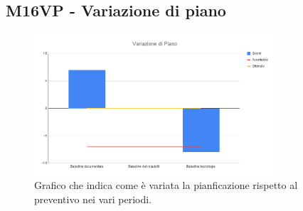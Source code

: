 \subsection{M16VP - Variazione di piano}
\begin{figure}[H]
    \centering\includegraphics[width=0.8\textwidth, height=0.8\textheight,keepaspectratio]{images/Variazione-di-Piano.png}
    \caption{Grafico che indica come è variata la pianficazione rispetto al preventivo nei vari periodi.}
\end{figure}  